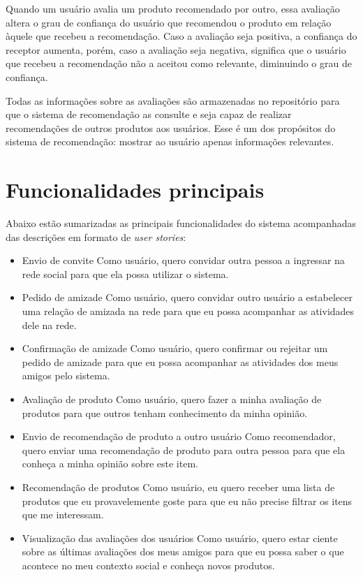  Quando um usuário avalia um produto recomendado por outro, essa avaliação altera o grau de confiança do usuário que recomendou o produto em relação àquele que recebeu a recomendação. Caso a avaliação seja positiva, a confiança do receptor aumenta, porém, caso a avaliação seja negativa, significa que o usuário que recebeu a recomendação não a aceitou como relevante, diminuindo o grau de confiança.

 Todas as informações sobre as avaliações são armazenadas no repositório para que o sistema de recomendação as consulte e seja capaz de realizar recomendações de outros produtos aos usuários. Esse é um dos propósitos do sistema de recomendação: mostrar ao usuário apenas informações relevantes.

\section{Funcionalidades principais} %
\label{sec:funcionalidades_principais}

Abaixo estão sumarizadas as principais funcionalidades do sistema acompanhadas das descrições em formato de \textit{user stories}\cite{557458}:

\begin{itemize}
  
  \item Envio de convite
  \subitem Como usuário, quero convidar outra pessoa a ingressar na rede social para que ela possa utilizar o sistema.
  
  \item Pedido de amizade
  \subitem Como usuário, quero convidar outro usuário a estabelecer uma relação de amizada na rede para que eu possa acompanhar as atividades dele na rede.
  
  \item Confirmação de amizade
  \subitem Como usuário, quero confirmar ou rejeitar um pedido de amizade para que eu possa acompanhar as atividades dos meus amigos pelo sistema.
	
	\item Avaliação de produto
  \subitem Como usuário, quero fazer a minha avaliação de produtos para que outros tenham conhecimento da minha opinião.
  
	\item Envio de recomendação de produto a outro usuário
  \subitem Como recomendador, quero enviar uma recomendação de produto para outra pessoa para que ela conheça a minha opinião sobre este item.
  
	\item Recomendação de produtos
	\subitem Como usuário, eu quero receber uma lista de produtos que eu provavelemente goste para que eu não precise filtrar os itens que me interessam.

    \item Visualização das avaliações dos usuários
    \subitem Como usuário, quero estar ciente sobre as últimas avaliações dos meus amigos para que eu possa saber o que acontece no meu contexto social e conheça novos produtos.
	
\end{itemize}

